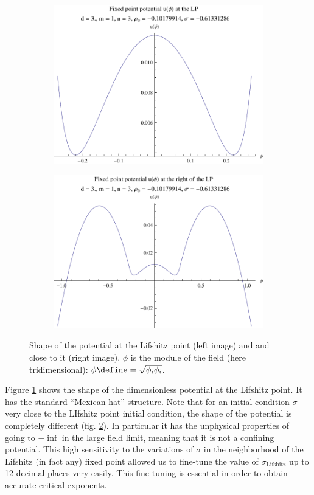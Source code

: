 \begin{figure}[htp]
\centering
\begin{subfigure}{.5\textwidth}
	\centering
	\includegraphics[width=.9\linewidth]{img/chap4/plotfieldd3.pdf}
	\caption{}
	\label{fig:plotfield}
	\end{subfigure}%
\begin{subfigure}{.5\textwidth}
	\centering
	\includegraphics[width=.9\linewidth]{img/chap4/plotfieldrightd3.pdf}
	\caption{}
	\label{fig:plotfieldright}
\end{subfigure}
\caption{Shape of the potential at the Lifshitz point (left image) and and close to it (right image). $\phi$ is the module of the field (here tridimensional): $\phi \define = \sqrt{\phi_i \phi_i}$.}
\label{fig:pot_d3}
\end{figure}

Figure \ref{fig:plotfield} shows the shape of the dimensionless potential at the Lifshitz point. It has the standard ``Mexican-hat'' structure. Note that for an initial condition $\sigma$ very close to the LIfshitz point initial condition, the shape of the potential is completely different (fig. \ref{fig:plotfieldright}). In particular it has the unphysical properties of going to $-\inf$ in the large field limit, meaning that it is not a confining potential. This high sensitivity to the variations of $\sigma$ in the neighborhood of the Lifshitz (in fact any) fixed point allowed us to fine-tune the value of $\sigma_{\text{Lifshitz}}$ up to 12 decimal places very easily. This fine-tuning is essential in order to obtain accurate critical exponents.

